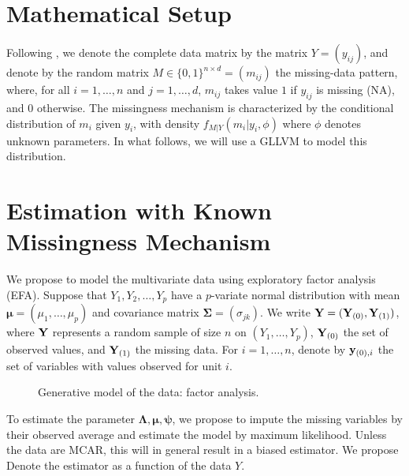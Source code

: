 \documentclass{article}
\begin{document}
\section{Mathematical Setup}
Following \textcite{little_statistical_2019}, we denote the complete data matrix  by the matrix $Y=(y_{ij})$, and denote by the random matrix $M \in \{0, 1\}^{n\times d} = (m_{ij})$ the missing-data pattern, where, for all $i=1, \dots, n$ and $j=1,  \dots, d$,  $m_{ij}$ takes value $1$ if $y_{ij}$ is missing (NA), and $0$ otherwise. The missingness mechanism is characterized by the conditional distribution of $m_i$ given $y_i$, with density $f_{M|Y}(m_i|y_i, \phi)$ where $\phi$ denotes unknown parameters. In what follows, we will use a GLLVM to model this distribution.



\section{Estimation with Known Missingness Mechanism}
We propose to model the multivariate data using exploratory factor analysis (EFA). Suppose that $Y_1, Y_2, \dots, Y_p$ have a $p$-variate normal distribution with mean $\bm\mu = (\mu_1, \dots, \mu_p)$ and covariance matrix $\bm\Sigma =(\sigma_{jk})$. We write ${\bf Y} = ({\bf Y}_{(0)}, {\bf Y}_{(1)})$, where ${\bf Y}$ represents a random sample of size $n$ on $(Y_1, \dots, Y_p)$, ${\bf Y}_{(0)}$ the set of observed values, and ${\bf Y}_{(1)}$ the missing data. For $i=1, \dots, n$, denote by ${\bf y}_{(0), i}$ the set of variables with values observed for unit $i$.

\begin{figure}
\centering
\caption{Generative model of the data: factor analysis.}
\end{figure}

To estimate the parameter $\bm\Lambda, \bm\mu,\bm\psi$, we propose to impute the missing variables by their observed average and estimate the model by maximum likelihood. Unless the data are MCAR, this will in general result in a biased estimator. We propose  Denote the estimator as a function of the data $Y$. 
\end{document}
